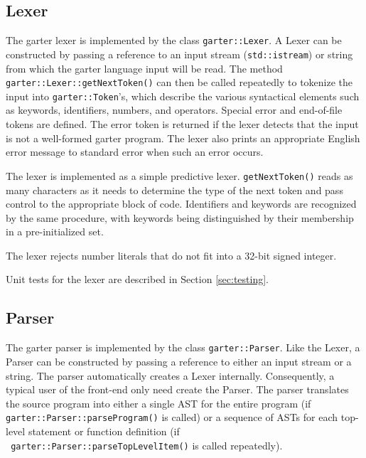 \documentclass[11pt]{article}
\begin{document}
\subsection{Lexer}

\label{sec:Lexer}

The garter lexer is implemented by the class {\tt garter::Lexer}.  A Lexer can
be constructed by passing a reference to an input stream ({\tt std::istream}) or
string from which the garter language input will be read.  The method {\tt
garter::Lexer::getNextToken()} can then be called repeatedly to tokenize the
input into {\tt garter::Token}'s, which describe the various syntactical
elements such as keywords, identifiers, numbers, and operators.  Special error
and end-of-file tokens are defined.  The error token is returned if the lexer
detects that the input is not a well-formed garter program.  The lexer also
prints an appropriate English error message to standard error when such an error
occurs.

The lexer is implemented as a simple predictive lexer.  {\tt getNextToken()}
reads as many characters as it needs to determine the type of the next token and
pass control to the appropriate block of code.  Identifiers and keywords are
recognized by the same procedure, with keywords being distinguished by their
membership in a pre-initialized set.

The lexer rejects number literals that do not fit into a 32-bit signed integer.

Unit tests for the lexer are described in Section \ref{sec:testing}.

\subsection{Parser}

\label{sec:Parser}

The garter parser is implemented by the class {\tt garter::Parser}.  Like the
Lexer, a Parser can be constructed by passing a reference to either an input
stream or a string.  The parser automatically creates a Lexer internally.
Consequently, a typical user of the front-end only need create the Parser.  The
parser translates the source program into either a single AST for the entire
program (if {\tt garter::Parser::parseProgram()} is called) or a sequence of
ASTs for each top-level statement or function definition (if \\{\tt
garter::Parser::parseTopLevelItem()} is called repeatedly).
\end{document}
